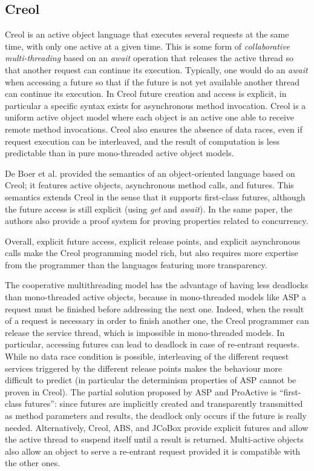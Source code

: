 \subsection{Creol} Creol \cite{Johnsen2006a,Elinar2006} is an active object language
that executes several requests at the same time, with only one active at a given time.
This is some form of \emph{collaborative multi-threading} based on an \emph{await}
operation that releases the active thread so that another request can continue its
execution. Typically, one would do an \emph{await} when accessing a future so that if
the future is not yet available another thread can continue its execution. In Creol
\cite{Johnsen2006a} future creation and access is explicit, in particular a specific
syntax exists for asynchronous method invocation. Creol is a uniform active object model
where each object is an active one able to receive remote method invocations.  Creol
also ensures the absence of data races, even if request execution can be interleaved,
and the result of computation is less predictable than in pure mono-threaded active
object models.


De Boer et al.   \cite{SDE:BoerCJ07}  provided 
the semantics of an
object-oriented language based on Creol; it features
active objects, asynchronous method calls, and futures. This semantics
extends Creol in the sense that it
supports first-class futures, although the future access is  still
explicit (using \emph{get} and \emph{await}). 
In the same paper, the authors also provide a proof system for proving properties
related to concurrency. 

\smallskip


Overall, explicit future access,
explicit release points, and explicit asynchronous calls make the Creol
programming model rich, but also requires more expertise from the programmer than the 
languages featuring more transparency. 


 The cooperative multithreading model has the
advantage of having less deadlocks than mono-threaded active objects, because in
mono-threaded models like ASP a request must be finished before addressing the next one.
Indeed, when the result of a request is necessary in order to finish another one, the
Creol programmer can release the service thread, which is impossible in mono-threaded
models. In particular, accessing futures can lead to deadlock in case of re-entrant
requests. While no data race condition is possible, interleaving of the different
request services triggered by the different release points makes the behaviour more
difficult to predict (in particular the determinism properties of ASP cannot be proven
in Creol).
 The partial solution proposed by ASP and ProActive is ``first-class
futures'': since futures are implicitly created and transparently
transmitted as method parameters and results, the deadlock only occurs
if the future is really needed.  Alternatively, Creol, ABS, and JCoBox
provide explicit futures and allow the active thread to suspend itself
until a result is returned. Multi-active objects also allow an object to serve a 
re-entrant request provided it is compatible with the other ones.

